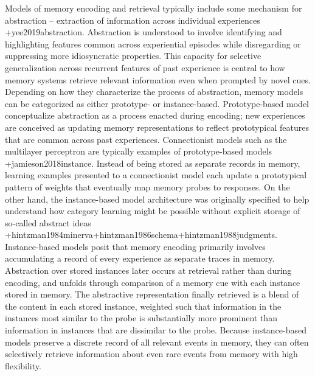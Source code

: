 Models of memory encoding and retrieval typically include some mechanism for abstraction -- extraction of information across individual experiences +{}{}{yee2019abstraction}. Abstraction is understood to involve identifying and highlighting features common across experiential episodes while disregarding or suppressing more idiosyncratic properties. This capacity for selective generalization across recurrent features of past experience is central to how memory systems retrieve relevant information even when prompted by novel cues.\markdownRendererInterblockSeparator
{}Depending on how they characterize the process of abstraction, memory models can be categorized as either prototype- or instance-based. Prototype-based model conceptualize abstraction as a process enacted during encoding; new experiences are conceived as updating memory representations to reflect prototypical features that are common across past experiences. Connectionist models such as the multilayer perceptron are typically examples of prototype-based models +{}{}{jamieson2018instance}. Instead of being stored as separate records in memory, learning examples presented to a connectionist model each update a prototypical pattern of weights that eventually map memory probes to responses.\markdownRendererInterblockSeparator
{}On the other hand, the instance-based model architecture was originally specified to help understand how category learning might be possible without explicit storage of so-called abstract ideas +{}{}{hintzman1984minerva}+{}{}{hintzman1986schema}+{}{}{hintzman1988judgments}. Instance-based models posit that memory encoding primarily involves accumulating a record of every experience as separate traces in memory. Abstraction over stored instances later occurs at retrieval rather than during encoding, and unfolds through comparison of a memory cue with each instance stored in memory. The abstractive representation finally retrieved is a blend of the content in each stored instance, weighted such that information in the instances most similar to the probe is substantially more prominent than information in instances that are dissimilar to the probe. Because instance-based models preserve a discrete record of all relevant events in memory, they can often selectively retrieve information about even rare events from memory with high flexibility.\markdownRendererInterblockSeparator
